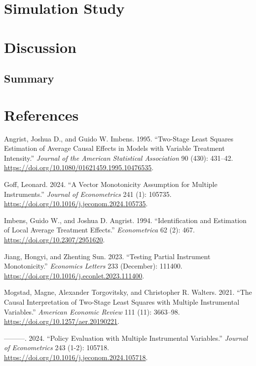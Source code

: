 \documentclass[
  12pt,
  a4paper,
  oneside]{article}
\newlength{\cslhangindent}
\newenvironment{CSLReferences}[2] %
 {\begin{list}{}{%
  \setlength{\itemindent}{0pt}
  \setlength{\leftmargin}{0pt}
  \setlength{\parsep}{0pt}
  \ifodd #1
   \setlength{\leftmargin}{\cslhangindent}
   \setlength{\itemindent}{-1\cslhangindent}
  \fi
  \setlength{\itemsep}{#2\baselineskip}}}
 {\end{list}}
\begin{document}
\newpage

\section{Simulation Study}\label{simulation-study}

\section{Discussion}\label{discussion}

\subsection{Summary}\label{summary}

\newpage

\section*{References}\label{references}

\pagestyle{plain}

\label{refs}
\begin{CSLReferences}{1}{0}
Angrist, Joshua D., and Guido W. Imbens. 1995. {``Two-Stage Least
Squares Estimation of Average Causal Effects in Models with Variable
Treatment Intensity.''} \emph{Journal of the American Statistical
Association} 90 (430): 431--42.
\url{https://doi.org/10.1080/01621459.1995.10476535}.

Goff, Leonard. 2024. {``A Vector Monotonicity Assumption for Multiple
Instruments.''} \emph{Journal of Econometrics} 241 (1): 105735.
\url{https://doi.org/10.1016/j.jeconom.2024.105735}.

Imbens, Guido W., and Joshua D. Angrist. 1994. {``Identification and
Estimation of Local Average Treatment Effects.''} \emph{Econometrica} 62
(2): 467. \url{https://doi.org/10.2307/2951620}.

Jiang, Hongyi, and Zhenting Sun. 2023. {``Testing Partial Instrument
Monotonicity.''} \emph{Economics Letters} 233 (December): 111400.
\url{https://doi.org/10.1016/j.econlet.2023.111400}.

Mogstad, Magne, Alexander Torgovitsky, and Christopher R. Walters. 2021.
{``The Causal Interpretation of Two-Stage Least Squares with Multiple
Instrumental Variables.''} \emph{American Economic Review} 111 (11):
3663--98. \url{https://doi.org/10.1257/aer.20190221}.

---------. 2024. {``Policy Evaluation with Multiple Instrumental
Variables.''} \emph{Journal of Econometrics} 243 (1-2): 105718.
\url{https://doi.org/10.1016/j.jeconom.2024.105718}.

\end{CSLReferences}
\end{document}

